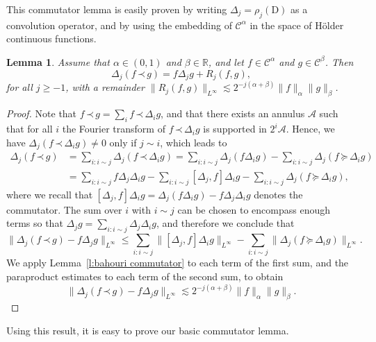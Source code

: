 \documentclass[a4paper,11pt]{article}
\newcommand{\mathD}{\mathrm{D}}
\newtheorem{lemma}[theorem]{Lemma}
\theoremstyle{remark}
\newcommand{\CA}{\ensuremath{\mathscr{A}}}
\newcommand{\CC}{\ensuremath{\mathscr{C}}}
\newcommand{\lpara}{\,\mathord{\prec}\,}
\newcommand{\rparacurl}{\, \mathord{\succcurlyeq} \,}
\begin{document}
This commutator lemma is easily proven by writing $\Delta_{j} = \rho_{j} (\mathD )$ as a convolution operator, and by using the embedding of $\CC^{\alpha}$ in the space of H{\"o}lder continuous functions.

\begin{lemma}\label{lemma:paraprojection}
  Assume that $\alpha \in ( 0,1 )$ and $\beta \in \mathbb{R}$, and let $f \in \CC^{\alpha}$ and $g \in \CC^{\beta}$. Then
  \[
     \Delta_{j} ( f \lpara g ) =f \Delta_{j} g+R_{j} ( f,g ) ,
  \]
  for all $j \geqslant -1$, with a remainder $\| R_{j} ( f,g ) \|_{L^{\infty}} \lesssim 2^{-j ( \alpha + \beta )} \| f \|_{\alpha} \| g  \|_{\beta}$.
\end{lemma}

\begin{proof}
  Note that $f \lpara g= \sum_{i} f \lpara \Delta_{i} g$, and that there exists an annulus $\CA$ such that for all $i$ the Fourier  transform of $f \lpara \Delta_{i} g$ is supported in $2^{i} \CA$. Hence, we have $\Delta_{j} ( f \lpara \Delta_{i} g ) \neq 0$ only if $j \sim i$, which leads to
  \begin{align*}
     \Delta_{j} ( f \lpara g ) &= \sum_{i:i \sim j} \Delta_{j} ( f \lpara \Delta_{i} g ) = \sum_{i:i \sim j} \Delta_{j} ( f \Delta_{i} g ) -  \sum_{i:i \sim j} \Delta_{j} ( f \rparacurl \Delta_{i} g ) \\
     & = \sum_{i:i \sim j} f \Delta_{j} \Delta_{i} g- \sum_{i:i \sim j} [\Delta_{j} ,f ] \Delta_{i} g- \sum_{i:i \sim j} \Delta_{j} ( f \rparacurl \Delta_{i} g ),
  \end{align*}
  where we recall that $[ \Delta_{j} ,f ] \Delta_{i} g= \Delta_{j} ( f\Delta_{i} g ) -f \Delta_{j} \Delta_{i} g$ denotes the commutator. The sum over $i$ with $i \sim j$ can be chosen to encompass enough terms so that $\Delta_{j} g= \sum_{i:i \sim j} \Delta_{j} \Delta_{i} g$, and therefore we conclude that
  \[
     \| \Delta_{j} ( f \lpara g ) -f \Delta_{j} g \|_{L^{\infty}} \leqslant  \sum_{i:i \sim j} \| [ \Delta_{j} ,f ] \Delta_{i} g \|_{L^{\infty}} -  \sum_{i:i \sim j} \| \Delta_{j} ( f \rparacurl \Delta_{i} g )
     \|_{L^{\infty}}.
  \]
  We apply Lemma~\ref{l:bahouri commutator} to each term of the first sum, and the paraproduct estimates to each term of the second sum, to obtain
  \[
     \| \Delta_{j} ( f \lpara g ) -f \Delta_{j} g \|_{L^{\infty}} \lesssim  2^{-j ( \alpha + \beta )} \| f \|_{\alpha} \| g \|_{\beta} .
  \]
\end{proof}

Using this result, it is easy to prove our basic commutator lemma.
\end{document}

